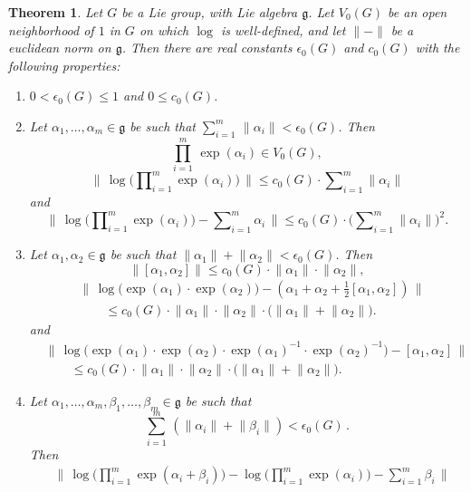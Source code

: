 \documentclass[10pt, a4paper]{amsart}
\newtheorem{thm}[equation]{Theorem}
\theoremstyle{definition}
\numberwithin{equation}{section}
\newcommand{\opn}{\operatorname}
\newcommand{\rmitem}[1]{\item[\text{\textup{(#1)}}]}
\newcommand{\mfrak}[1]{\mathfrak{#1}}
\newcommand{\smfrac}[2]{{\textstyle \frac{#1}{#2}}}
\newcommand{\norm}[1]{\lVert #1 \rVert}
\newcommand{\Norm}[1]{\bigl\lVert\, #1 \, \bigr\rVert}
\newcommand{\g}{\mfrak{g}}
\begin{document}
\begin{thm} \label{thm:6}
Let $G$ be a Lie group, with Lie algebra $\g$. Let $V_0(G)$ be an  open
neighborhood of $1$ in $G$ on which $\log$ is well-defined, and
let $\norm{-}$ be a euclidean norm on $\g$. 
Then there are real constants $\epsilon_0(G)$ and $c_0(G)$ with the following
properties:
\begin{enumerate}
\rmitem{i} $0 < \epsilon_0(G) \leq 1$ and $0 \leq c_0(G)$.
% 
\rmitem{ii} Let $\alpha_1, \ldots, \alpha_m \in \g$ be such that
$\sum_{i = 1}^m\, \norm{\alpha_i} < \epsilon_0(G)$.
Then
\[ \prod_{i=1}^m\, \opn{exp}(\alpha_i) \in V_0(G) ,  \]
\[ \Norm{ \opn{log} 
\bigl( \prod\nolimits_{i=1}^m \opn{exp}(\alpha_i) \bigr) } 
\leq c_0(G) \cdot \sum\nolimits_{i=1}^m \norm{\alpha_i} \]
and
\[ \Norm{ \opn{log} 
\bigl( \prod\nolimits_{i=1}^m \opn{exp}(\alpha_i) \bigr) -
\sum\nolimits_{i=1}^m \alpha_i } 
\leq c_0(G) \cdot \bigl( \sum\nolimits_{i=1}^m \norm{\alpha_i} \bigr)^2 . \]
%
\rmitem{iii} Let $\alpha_1, \alpha_2 \in \g$ be such that
$\norm{\alpha_1} + \norm{\alpha_2} < \epsilon_0(G)$. 
Then
\[  \norm{ [\alpha_1, \alpha_2] } \leq
c_0(G) \cdot \norm{\alpha_1} \cdot \norm{\alpha_2} , \]
\[ \begin{aligned}
& \Norm{ \opn{log} \bigl( \opn{exp}(\alpha_1) \cdot 
\opn{exp}(\alpha_2) \bigr) -  
( \alpha_1 + \alpha_2 + \smfrac{1}{2}[\alpha_1, \alpha_2] ) } \\
& \qquad %
\leq c_0(G) \cdot \norm{\alpha_1} \cdot \norm{\alpha_2} \cdot 
\bigl( \norm{\alpha_1} + \norm{\alpha_2} \bigr) .
\end{aligned} \]
and
\[ \begin{aligned}
& \Norm{ \opn{log} \bigl( \opn{exp}(\alpha_1) \cdot 
\opn{exp}(\alpha_2) \cdot \opn{exp}(\alpha_1)^{-1} \cdot
\opn{exp}(\alpha_2)^{-1} \bigr) -  
[\alpha_1, \alpha_2] } \\
& \qquad %
\leq c_{0}(G) \cdot \norm{\alpha_1} \cdot \norm{\alpha_2} \cdot 
\bigl( \norm{\alpha_1} + \norm{\alpha_2} \bigr) .
\end{aligned} \]
% 
\rmitem{iv} Let 
$\alpha_1, \ldots, \alpha_m, \beta_1, \ldots, \beta_m \in \g$ be
such that
\[ \sum_{i = 1}^m\, (\norm{\alpha_i} + \norm{\beta_i}) < \epsilon_0(G) \, . \]
Then
\[ \begin{aligned}
& \Norm{ \opn{log} 
\bigl( \prod\nolimits_{i=1}^m \opn{exp}(\alpha_i + \beta_i) \bigr) -
\opn{log} \bigl(   \prod\nolimits_{i=1}^m \opn{exp}(\alpha_i) \bigr) -
\sum\nolimits_{i=1}^m \beta_i } \\

\end{aligned}\]
\end{enumerate}
\end{thm}
\end{document}
